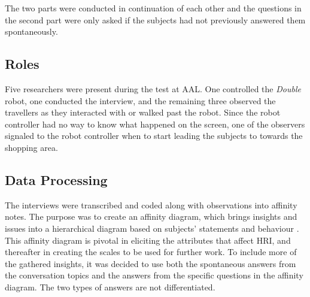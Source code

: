 The two parts were conducted in continuation of each other and the questions in the second part were only asked if the subjects had not previously answered them spontaneously.
 
\subsection{Roles}
Five researchers were present during the test at AAL. One controlled the \textit{Double} robot, one conducted the interview, and the remaining three observed the travellers as they interacted with or walked past the robot. Since the robot controller had no way to know what happened on the screen, one of the observers signaled to the robot controller when to start leading the subjects to towards the shopping area. 

\subsection{Data Processing}
The interviews were transcribed and coded along with observations into affinity notes. The purpose was to create an affinity diagram, which brings insights and issues into a hierarchical diagram based on subjects' statements and behaviour \cite{Wendell2005}. This affinity diagram is pivotal in eliciting the attributes that affect HRI, and thereafter in creating the scales to be used for further work. To include more of the gathered insights, it was decided to use both the spontaneous answers from the conversation topics and the answers from the specific questions in the affinity diagram. The two types of answers are not differentiated. 




